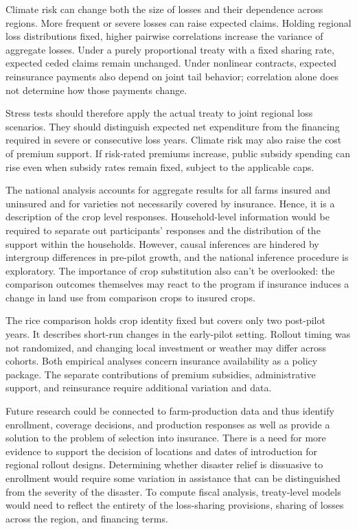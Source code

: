 
Climate risk can change both the size of losses and their dependence across regions. More frequent or severe losses can raise expected claims. Holding regional loss distributions fixed, higher pairwise correlations increase the variance of aggregate losses. Under a purely proportional treaty with a fixed sharing rate, expected ceded claims remain unchanged. Under nonlinear contracts, expected reinsurance payments also depend on joint tail behavior; correlation alone does not determine how those payments change.

Stress tests should therefore apply the actual treaty to joint regional loss scenarios. They should distinguish expected net expenditure from the financing required in severe or consecutive loss years. Climate risk may also raise the cost of premium support. If risk-rated premiums increase, public subsidy spending can rise even when subsidy rates remain fixed, subject to the applicable caps.


The national analysis accounts for aggregate results for all farms insured and uninsured and for varieties not necessarily covered by insurance. Hence, it is a description of the crop level responses. Household-level information would be required to separate out participants' responses and the distribution of the support within the households. However, causal inferences are hindered by intergroup differences in pre-pilot growth, and the national inference procedure is exploratory. The importance of crop substitution also can't be overlooked: the comparison outcomes themselves may react to the program if insurance induces a change in land use from comparison crops to insured crops.

The rice comparison holds crop identity fixed but covers only two post-pilot years. It describes short-run changes in the early-pilot setting. Rollout timing was not randomized, and changing local investment or weather may differ across cohorts. Both empirical analyses concern insurance availability as a policy package. The separate contributions of premium subsidies, administrative support, and reinsurance require additional variation and data.

Future research could be connected to farm-production data and thus identify enrollment, coverage decisions, and production responses as well as provide a solution to the problem of selection into insurance. There is a need for more evidence to support the decision of locations and dates of introduction for regional rollout designs. Determining whether disaster relief is dissuasive to enrollment would require some variation in assistance that can be distinguished from the severity of the disaster. To compute fiscal analysis, treaty-level models would need to reflect the entirety of the loss-sharing provisions, sharing of losses across the region, and financing terms.
